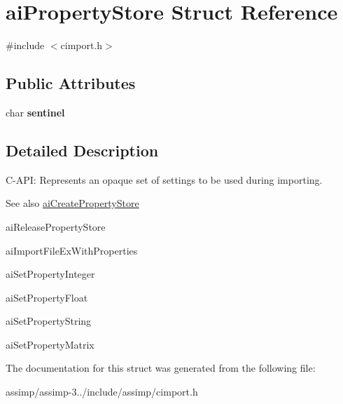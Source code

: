 \hypertarget{structai_property_store}{\section{ai\+Property\+Store Struct Reference}
\label{structai_property_store}
}


{\ttfamily \#include $<$cimport.\+h$>$}

\subsection*{Public Attributes}
\begin{DoxyCompactItemize}
\item 
\hypertarget{structai_property_store_a53e97983bdbe38c596c7879555dc42a3}{char {\bfseries sentinel}}\label{structai_property_store_a53e97983bdbe38c596c7879555dc42a3}

\end{DoxyCompactItemize}


\subsection{Detailed Description}
C-\/\+A\+P\+I\+: Represents an opaque set of settings to be used during importing. \begin{DoxySeeAlso}{See also}
\hyperlink{_assimp_8cpp_ab6085941982ef6158f3aa8be87470602}{ai\+Create\+Property\+Store} 

ai\+Release\+Property\+Store 

ai\+Import\+File\+Ex\+With\+Properties 

ai\+Set\+Property\+Integer 

ai\+Set\+Property\+Float 

ai\+Set\+Property\+String 

ai\+Set\+Property\+Matrix 
\end{DoxySeeAlso}


The documentation for this struct was generated from the following file\+:\begin{DoxyCompactItemize}
\item 
assimp/assimp-\/3../include/assimp/cimport.\+h\end{DoxyCompactItemize}
